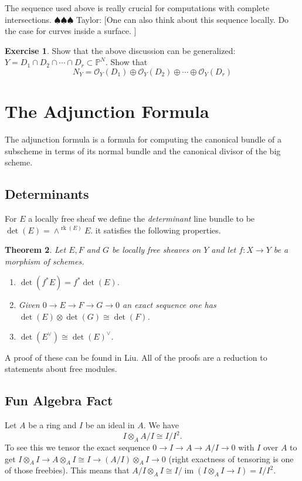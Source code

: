 \documentclass[12pt]{article}
\numberwithin{equation}{section}
\newtheorem{theorem}{Theorem}[subsection]
\theoremstyle{definition}
\newtheorem{exercise}[theorem]{Exercise}
\theoremstyle{remark}
\newcommand{\Ocal}{\mathcal{O}}
\newcommand{\PP}{\mathbb{P}}
\newcommand{\im}{\operatorname{im}}
\newcommand{\rk}{\operatorname{rk}}
\newcommand{\taylor}[1]{{\color{blue} \sf $\spadesuit\spadesuit\spadesuit$ Taylor: [#1]}}
\begin{document}
The sequence used above is really crucial for computations with complete intersections. \taylor{One can also think about this sequence locally. 
Do the case for curves inside a surface. }

\begin{exercise}
Show that the above discussion can be generalized: $Y = D_1 \cap D_2 \cap \cdots \cap D_r \subset \PP^N$. 
Show that 
 $$ N_Y = \Ocal_Y(D_1) \oplus \Ocal_Y(D_2) \oplus \cdots \oplus \Ocal_Y(D_r) $$
\end{exercise}

\section{The Adjunction Formula}
The adjunction formula is a formula for computing the canonical bundle of a subscheme in terms of its normal bundle and the canonical divisor of the big scheme.
\subsection{Determinants}
For $E$ a locally free sheaf we define the \emph{determinant} line bundle to be $ \det(E) = \wedge^{\rk(E)} E.$
it satisfies the following properties. 
\begin{theorem}
	Let $E,F$ and $G$ be locally free sheaves on $Y$ and let $f:X\to Y$ be a morphism of schemes.
	\begin{enumerate}
		\item $\det(f^*E) = f^*\det(E)$.
		\item Given $0 \to E \to F \to G \to 0$ an exact sequence one has $\det(E)\otimes \det(G) \cong \det(F)$.
		\item $\det(E^{\vee}) \cong \det(E)^{\vee}$.
	\end{enumerate}
\end{theorem}
A proof of these can be found in Liu. 
All of the proofs are a reduction to statements about free modules. 


\subsection{Fun Algebra Fact}
Let $A$ be a ring and $I$ be an ideal in $A$. 
We have 
$$I \otimes_A A/I \cong I/I^2.$$
To see this we tensor the exact sequence $0 \to I \to A \to A/I \to 0$ with $I$ over $A$ to get $I \otimes_A I \to A \otimes_A I \cong I \to (A/I)\otimes_A I \to 0$ (right exactness of tensoring is one of those freebies). 
This means that $A/I\otimes_A I \cong I/\im(I\otimes_A I\to I) = I/I^2$.
\end{document}
